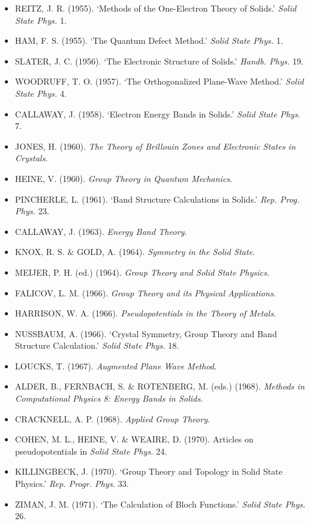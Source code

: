 \begin{itemize}[leftmargin=2em, itemsep=0.2em]
\item REITZ, J. R. (1955). `Methods of the One-Electron Theory of Solids.' \emph{Solid State Phys.} 1.
\item HAM, F. S. (1955). `The Quantum Defect Method.' \emph{Solid State Phys.} 1.
\item SLATER, J. C. (1956). `The Electronic Structure of Solids.' \emph{Handb. Phys.} 19.
\item WOODRUFF, T. O. (1957). `The Orthogonalized Plane-Wave Method.' \emph{Solid State Phys.} 4.
\item CALLAWAY, J. (1958). `Electron Energy Bands in Solids.' \emph{Solid State Phys.} 7.
\item JONES, H. (1960). \emph{The Theory of Brillouin Zones and Electronic States in Crystals}.
\item HEINE, V. (1960). \emph{Group Theory in Quantum Mechanics}.
\item PINCHERLE, L. (1961). `Band Structure Calculations in Solids.' \emph{Rep. Prog. Phys.} 23.
\item CALLAWAY, J. (1963). \emph{Energy Band Theory}.
\item KNOX, R. S. \& GOLD, A. (1964). \emph{Symmetry in the Solid State}.
\item MEIJER, P. H. (ed.) (1964). \emph{Group Theory and Solid State Physics}.
\item FALICOV, L. M. (1966). \emph{Group Theory and its Physical Applications}.
\item HARRISON, W. A. (1966). \emph{Pseudopotentials in the Theory of Metals}.
\item NUSSBAUM, A. (1966). `Crystal Symmetry, Group Theory and Band Structure Calculation.' \emph{Solid State Phys.} 18.
\item LOUCKS, T. (1967). \emph{Augmented Plane Wave Method}.
\item ALDER, B., FERNBACH, S. \& ROTENBERG, M. (eds.) (1968). \emph{Methods in Computational Physics 8: Energy Bands in Solids}.
\item CRACKNELL, A. P. (1968). \emph{Applied Group Theory}.
\item COHEN, M. L., HEINE, V. \& WEAIRE, D. (1970). Articles on pseudopotentials in \emph{Solid State Phys.} 24.
\item KILLINGBECK, J. (1970). `Group Theory and Topology in Solid State Physics.' \emph{Rep. Progr. Phys.} 33.
\item ZIMAN, J. M. (1971). `The Calculation of Bloch Functions.' \emph{Solid State Phys.} 26.
\end{itemize}

